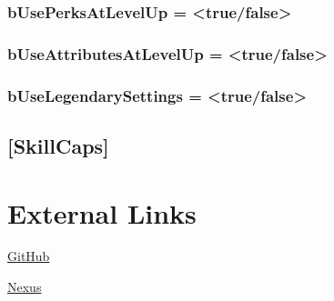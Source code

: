 \documentclass[12pt]{amsart}
\begin{document}
\subsubsection{bUsePerksAtLevelUp = <true/false>}

\subsubsection{bUseAttributesAtLevelUp = <true/false>}

\subsubsection{bUseLegendarySettings = <true/false>}

\subsection{[SkillCaps]}

\pagebreak
\section{External Links}

\href{https://github.com/TheDreadedAndy/SkyrimAEUncapper-Rust}{GitHub}

\href{https://www.nexusmods.com/skyrimspecialedition/mods/82558}{Nexus}
\end{document}
